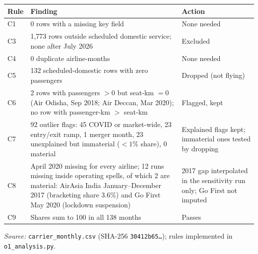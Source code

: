\documentclass[12pt,a4paper]{article}
\begin{document}
{\begin{minipage}{\linewidth}
\label{tab:o1-cleaning}
\centering
{\footnotesize{}\setlength{\tabcolsep}{4pt}
\begin{tabular}{@{}lp{9.6cm}p{4.2cm}@{}}
\toprule
Rule & Finding & Action \\
\midrule
C1 & 0 rows with a missing key field & None needed \\
C3 & 1,773 rows outside scheduled domestic service; none after July 2026 & Excluded \\
C4 & 0 duplicate airline-months & None needed \\
C5 & 132 scheduled-domestic rows with zero passengers & Dropped (not flying) \\
C6 & 2 rows with passengers $>0$ but seat-km $=0$ (Air Odisha, Sep 2018; Air Deccan, Mar 2020); no row with passenger-km $>$ seat-km & Flagged, kept \\
C7 & 92 outlier flags: 45 COVID or market-wide, 23 entry/exit ramp, 1 merger month, 23 unexplained but immaterial ($<1\%$ share), 0 material & Explained flags kept; immaterial ones tested by dropping \\
C8 & April 2020 missing for every airline; 12 runs missing inside operating spells, of which 2 are material: AirAsia India January--December 2017 (bracketing share 3.6\%) and Go First May 2020 (lockdown suspension) & 2017 gap interpolated in the sensitivity run only; Go First not imputed \\
C9 & Shares sum to 100 in all 138 months & Passes \\
\bottomrule
\end{tabular}\par}
\vspace{4pt}
{\footnotesize{}\raggedright\textit{Source:} \texttt{carrier\_monthly.csv} (SHA-256 \texttt{30412b65\ldots}); rules implemented in \texttt{o1\_analysis.py}.\par}
\end{minipage}
\par}
\end{document}
